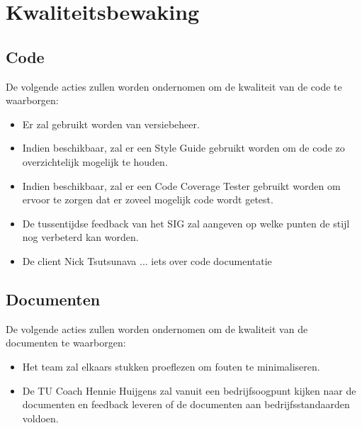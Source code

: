 \section{Kwaliteitsbewaking}
\subsection{Code}
De volgende acties zullen worden ondernomen om de kwaliteit van de code te waarborgen:

\begin{itemize}
	\item Er zal gebruikt worden van versiebeheer. 
	\item Indien beschikbaar, zal er een Style Guide gebruikt worden om de code zo overzichtelijk mogelijk te houden.
	\item Indien beschikbaar, zal er een Code Coverage Tester gebruikt worden om ervoor te zorgen dat er zoveel mogelijk code wordt getest. 
	\item De tussentijdse feedback van het SIG zal aangeven op welke punten de stijl nog verbeterd kan worden.
	\item De client Nick Tsutsunava ... iets over code documentatie %
\end{itemize}

\subsection{Documenten}
De volgende acties zullen worden ondernomen om de kwaliteit van de documenten te waarborgen:
\begin{itemize}
	\item Het team zal elkaars stukken proeflezen om fouten te minimaliseren.
	\item De TU Coach Hennie Huijgens zal vanuit een bedrijfsoogpunt kijken naar de documenten en feedback leveren of de documenten aan bedrijfsstandaarden voldoen.
\end{itemize}

